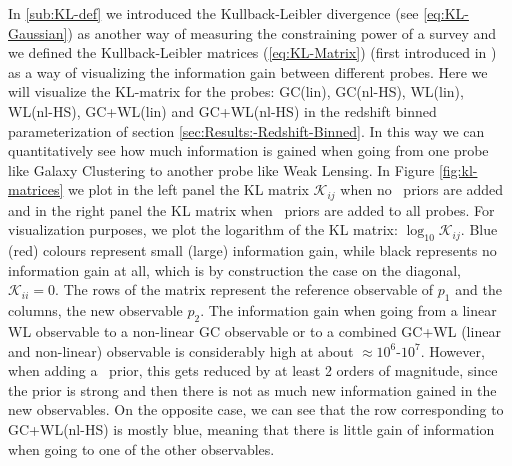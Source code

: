 In \cref{sub:KL-def} we introduced the Kullback-Leibler divergence (see \cref{eq:KL-Gaussian}) as another way of measuring 
the constraining power of a survey and we defined the Kullback-Leibler matrices (\cref{eq:KL-Matrix}) (first introduced in \cite{casas_linear_2017}) as a way
of visualizing the information gain between different probes.
Here we will visualize the KL-matrix for the probes: GC(lin), GC(nl-HS), WL(lin), WL(nl-HS), GC+WL(lin) and GC+WL(nl-HS) in the redshift
binned parameterization of section \ref{sec:Results:-Redshift-Binned}.
In this way we can quantitatively see how much information is gained when going from one probe like Galaxy Clustering 
to another probe like Weak Lensing. 
In Figure \ref{fig:kl-matrices} we plot in the left panel the KL matrix $\mathcal{K}_{ij}$ when no \planck\ priors are added and 
in the right panel the KL matrix when \planck\ priors are added to all probes. 
For visualization purposes, 
we plot the logarithm of the KL matrix: $\log_{10} \mathcal{K}_{ij}$. 
Blue (red) colours represent small (large) information gain, while
black represents no information gain at all, which is by construction the case on the diagonal, $\mathcal{K}_{ii}=0$. 
The rows of the matrix represent the reference observable of $p_1$ and the columns,
the new observable $p_2$.
The information gain when going from a linear WL observable to a non-linear GC observable or to a combined GC+WL (linear and non-linear) 
observable is considerably high at about $\approx 10^6$-$10^7$. 
However, when adding a \planck\ prior, this gets reduced by at least 2 orders of magnitude, 
since the prior is strong and then there is not as much new information gained in the new observables. 
On the opposite case, we can see that the row corresponding to GC+WL(nl-HS) is mostly blue, 
meaning that there is little gain of information when going to one of the other observables.

